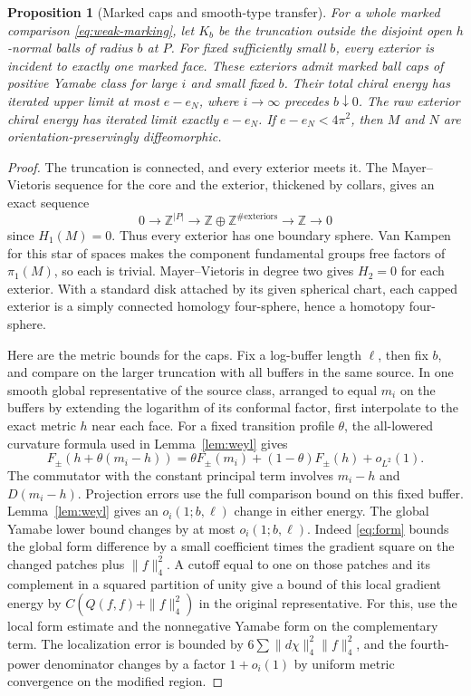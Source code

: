 \documentclass[11pt]{article}
\newtheorem{proposition}[theorem]{Proposition}
\theoremstyle{definition}
\theoremstyle{remark}
\begin{document}
\begin{proposition}[Marked caps and smooth-type transfer]\label{prop:cap}
For a whole marked comparison \eqref{eq:weak-marking}, let \(K_b\) be the truncation outside the disjoint open \(h\)-normal balls of radius \(b\) at \(P\). For fixed sufficiently small \(b\), every exterior is incident to exactly one marked face. These exteriors admit marked ball caps of positive Yamabe class for large \(i\) and small fixed \(b\). Their total chiral energy has iterated upper limit at most \(e-e_N\), where \(i\to\infty\) precedes \(b\downarrow0\). The raw exterior chiral energy has iterated limit exactly \(e-e_N\). If \(e-e_N<4\pi^2\), then \(M\) and \(N\) are orientation-preservingly diffeomorphic.
\end{proposition}
\begin{proof}
The truncation is connected, and every exterior meets it. The Mayer--Vietoris sequence for the core and the exterior, thickened by collars, gives an exact sequence
\[
 0\longrightarrow\mathbb Z^{|P|}\longrightarrow
 \mathbb Z\oplus\mathbb Z^{\#\text{exteriors}}\longrightarrow \mathbb Z\longrightarrow0
\]
since \(H_1(M)=0\). Thus every exterior has one boundary sphere. Van Kampen for this star of spaces makes the component fundamental groups free factors of \(\pi_1(M)\), so each is trivial. Mayer--Vietoris in degree two gives \(H_2=0\) for each exterior. With a standard disk attached by its given spherical chart, each capped exterior is a simply connected homology four-sphere, hence a homotopy four-sphere.

Here are the metric bounds for the caps. Fix a log-buffer length \(\ell\), then fix \(b\), and compare on the larger truncation with all buffers in the same source. In one smooth global representative of the source class, arranged to equal \(m_i\) on the buffers by extending the logarithm of its conformal factor, first interpolate to the exact metric \(h\) near each face. For a fixed transition profile \(\theta\), the all-lowered curvature formula used in Lemma~\ref{lem:weyl} gives
\[
 F_\pm(h+\theta(m_i-h))
   =\theta F_\pm(m_i)+(1-\theta)F_\pm(h)+o_{L^2}(1).
\]
The commutator with the constant principal term involves \(m_i-h\) and \(D(m_i-h)\). Projection errors use the full comparison bound on this fixed buffer. Lemma~\ref{lem:weyl} gives an \(o_i(1;b,\ell)\) change in either energy. The global Yamabe lower bound changes by at most \(o_i(1;b,\ell)\). Indeed \eqref{eq:form} bounds the global form difference by a small coefficient times the gradient square on the changed patches plus \(\|f\|_4^2\). A cutoff equal to one on those patches and its complement in a squared partition of unity give a bound of this local gradient energy by \(C(Q(f,f)+\|f\|_4^2)\) in the original representative. For this, use the local form estimate and the nonnegative Yamabe form on the complementary term. The localization error is bounded by \(6\sum\|d\chi\|_4^2\|f\|_4^2\), and the fourth-power denominator changes by a factor \(1+o_i(1)\) by uniform metric convergence on the modified region.


\end{proof}
\end{document}
